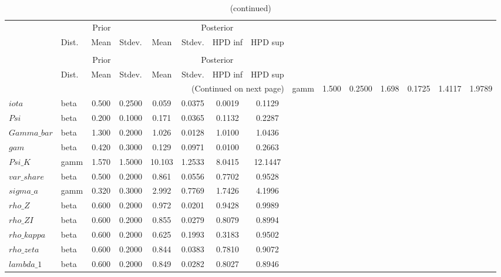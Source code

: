  
\begin{center}
\begin{longtable}{llcccccc} 
\caption{Results from Metropolis-Hastings (parameters)}
 \label{Table:MHPosterior:1}\\
\toprule 
  & \multicolumn{3}{c}{Prior}  &  \multicolumn{4}{c}{Posterior} \\
  \cmidrule(r{.75em}){2-4} \cmidrule(r{.75em}){5-8}
  & Dist. & Mean  & Stdev. & Mean & Stdev. & HPD inf & HPD sup\\
\midrule \endfirsthead 
\caption{(continued)}\\\toprule 
  & \multicolumn{3}{c}{Prior}  &  \multicolumn{4}{c}{Posterior} \\
  \cmidrule(r{.75em}){2-4} \cmidrule(r{.75em}){5-8}
  & Dist. & Mean  & Stdev. & Mean & Stdev. & HPD inf & HPD sup\\
\midrule \endhead 
\bottomrule \multicolumn{8}{r}{(Continued on next page)} \endfoot 
\bottomrule \endlastfoot 
$sigma$ & gamm &   1.500 & 0.2500 &   1.698& 0.1725 &  1.4117 &  1.9789 \\ 
$iota$ & beta &   0.500 & 0.2500 &   0.059& 0.0375 &  0.0019 &  0.1129 \\ 
$Psi$ & beta &   0.200 & 0.1000 &   0.171& 0.0365 &  0.1132 &  0.2287 \\ 
$Gamma\_bar$ & beta &   1.300 & 0.2000 &   1.026& 0.0128 &  1.0100 &  1.0436 \\ 
$gam$ & beta &   0.420 & 0.3000 &   0.129& 0.0971 &  0.0100 &  0.2663 \\ 
$Psi\_K$ & gamm &   1.570 & 1.5000 &  10.103& 1.2533 &  8.0415 & 12.1447 \\ 
$var\_share$ & beta &   0.500 & 0.2000 &   0.861& 0.0556 &  0.7702 &  0.9528 \\ 
$sigma\_a$ & gamm &   0.320 & 0.3000 &   2.992& 0.7769 &  1.7426 &  4.1996 \\ 
$rho\_Z$ & beta &   0.600 & 0.2000 &   0.972& 0.0201 &  0.9428 &  0.9989 \\ 
$rho\_ZI$ & beta &   0.600 & 0.2000 &   0.855& 0.0279 &  0.8079 &  0.8994 \\ 
$rho\_kappa$ & beta &   0.600 & 0.2000 &   0.625& 0.1993 &  0.3183 &  0.9502 \\ 
$rho\_zeta$ & beta &   0.600 & 0.2000 &   0.844& 0.0383 &  0.7810 &  0.9072 \\ 
$lambda\_1$ & beta &   0.600 & 0.2000 &   0.849& 0.0282 &  0.8027 &  0.8946 \\ 
\end{longtable}
 \end{center}
